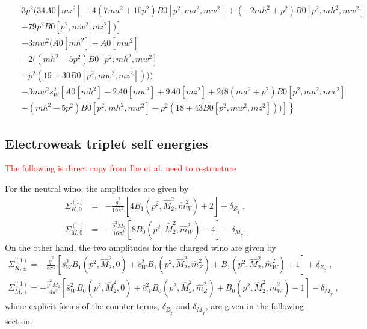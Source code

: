\documentclass[11pt]{article}
\begin{document}
{\begin{eqnarray}
&&    3 p^2 (34 A0[mz^2] + 4 (7 ma^2 + 10 p^2) B0[p^2, ma^2, mw^2] + (-2 mh^2 + p^2) B0[p^2, mh^2, mw^2] \nonumber\\
&& \left.- 79 p^2 B0[p^2, mw^2, mz^2])\right]    \nonumber\\
&& +  3 mw^2 (A0[mh^2] - A0[mw^2] \nonumber\\
&& -  2 ((mh^2 - 5 p^2) B0[p^2, mh^2, mw^2]\nonumber\\
&&       + p^2 (19 + 30 B0[p^2, mw^2, mz^2])))\nonumber \\
&&     - 3 mw^2 s_W^2 \left[A0[mh^2] - 2 A0[mw^2] + 9 A0[mz^2] + 2 (8 (ma^2 + p^2) B0[p^2, ma^2, mw^2] \right.\nonumber\\
&& \left. \left .- (mh^2 - 5 p^2) B0[p^2, mh^2, mw^2] - p^2 (18 + 43 B0[p^2, mw^2, mz^2]))\right] \right\}\nonumber
\end{eqnarray}
}





\subsection{Electroweak triplet self energies}
\textcolor{red}{The following is direct copy from Ibe et al.  need to restructure}

For the neutral wino, the amplitudes are given by
{
\begin{eqnarray}
\Sigma_{K, 0}^{(1)} &=&
-\frac{\hat{g}^2}{16\pi^2}
\left[ 4 B_1(p^2, \hat{M}_2^2, \hat{m}_W^2) + 2 \right]
+\delta_{Z_{\tilde{\chi}}}\ , \label{eq: Neu_K} \\
\Sigma_{M, 0}^{(1)} &=&
-\frac{\hat{g}^2 \hat{M}_2}{16\pi^2}
\left[ 8 B_0(p^2, \hat{M}_2^2, \hat{m}_W^2) - 4 \right]
-\delta_{M_{\tilde{\chi}}}\ . \label{eq: Neu_M}
\end{eqnarray}
}On the other hand, the two amplitudes for the charged wino are given by
{
\begin{eqnarray}
\Sigma_{K, \pm}^{(1)} =
-\frac{\hat{g}^2}{8\pi^2}
\left[ \hat{s}_W^2 B_1(p^2,\hat{M}_2^2,0)
+\hat{c}_W^2 B_1(p^2,\hat{M}_2^2, \hat m_Z^2)
+B_1(p^2, \hat{M}_2^2, \hat{m}_W^2) + 1  \right]
+ \delta_{Z_{\tilde{\chi}}}\ , \label{eq: Cha_K} \\
\Sigma_{M, \pm}^{(1)} =
-\frac{\hat{g}^2 \hat{M}_2}{4\pi^2}
\left[ \hat{s}_W^2 B_0(p^2, \hat{M}_2^2,0)
+\hat{c}_W^2 B_0(p^2, \hat{M}_2^2, \hat{m}_Z^2)
+B_0(p^2, \hat{M}_2^2, \hat{m}_W^2) - 1 \right]
-\delta_{M_{\tilde{\chi}}}\ ,
 \label{eq: Cha_M}
\end{eqnarray}
}where explicit forms of the counter-terms, $\delta_{Z_{\tilde{\chi}}}$ and $\delta_{M_{\tilde{\chi}}}$, are given in the following section.
\end{document}
